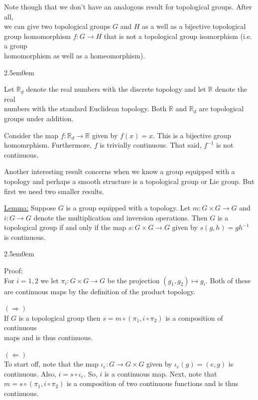 \documentclass{book}
\newcommand{\hTwo}{%
\color{Black}%
   \fontsize{13}{15}\selectfont%
}
\newcommand{\pracTwo}{
   \color{Orange}%
   \fontsize{12}{14}\selectfont%
}
\newcommand{\exTwo}{%
   \color{Purple}%
   \fontsize{13}{15}\selectfont%
}
\newcommand{\exThreeP}{%
   \color{RedViolet}%
   \fontsize{12}{14}\selectfont%
}
\newenvironment{myIndent}{%
   \begin{adjustwidth}{2.5em}{0em}%
}{%
   \end{adjustwidth}%
}
\newcommand{\retTwo}{\hfill\bigbreak}
\begin{document}
\hTwo Note though that we don't have an analogous result for topological groups. After all,\\ we can give two topological groups $G$ and $H$ as a well as a bijective topological group homomorphism $f: G \to H$ that is not a topological group isomorphism (i.e. a group\\ homomorphism as well as a homeomorphism).
\begin{myIndent}\pracTwo
	Let $\mathbb{R}_d$ denote the real numbers with the discrete topology and let $\mathbb{R}$ denote the real\\ numbers with the standard Euclidean topology. Both $\mathbb{R}$ and $\mathbb{R}_d$ are topological groups under addition.\retTwo

	Consider the map $f: \mathbb{R}_d \to \mathbb{R}$ given by $f(x) = x$. This is a bijective group homomrphism. Furthermore, $f$ is trivially continuous. That said, $f^{-1}$ is not continuous.\retTwo
\end{myIndent}

Another interesting result concerns when we know a group equipped with a topology and perhaps a smooth structure is a topological group or Lie group. But first we need two smaller results.\retTwo

\exTwo\ul{Lemma:} Suppose $G$ is a group equipped with a topology. Let $m: G \times G \to G$ and $i: G \to G$ denote the multiplication and inversion operations. Then $G$ is a topological group if and only if the map $s: G \times G \to G$ given by $s(g, h) = gh^{-1}$ is continuous. 
\begin{myIndent}\exThreeP
	Proof:\\
	For $i = 1, 2$ we let $\pi_i: G \times G \to G$ be the projection $(g_1, g_2) \mapsto g_i$. Both of these are continuous maps by the definition of the product topology.\retTwo

	$(\Longrightarrow)$\\
	If $G$ is a topological group then $s = m \circ (\pi_1, i \circ \pi_2)$ is a composition of continuous\\ maps and is thus continuous.\retTwo

	$(\Longleftarrow)$\\
	To start off, note that the map $\iota_e: G \to G \times G$ given by $\iota_e(g) = (e, g)$ is continuous. Also, $i = s \circ \iota_e$. So, $i$ is a continuous map. Next, note that $m = s \circ (\pi_1, i \circ \pi_2)$ is a composition of two continuous functions and is thus continuous.\retTwo
\end{myIndent}
\end{document}
